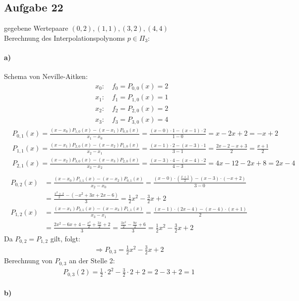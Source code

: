 \subsection*{Aufgabe 22}
gegebene Wertepaare $(0,2), (1,1), (3,2), (4,4)$\\
Berechnung des Interpolationspolynoms $p\in \Pi_3$:

\paragraph*{a)}
Schema von Neville-Aitken:\\
\begin{align*}
&x_0: \quad f_0=P_{0,0}(x)=2\\
&x_1: \quad f_1=P_{1,0}(x)=1\\
&x_2: \quad f_2=P_{2,0}(x)=2\\
&x_3: \quad f_3=P_{3,0}(x)=4
\end{align*}
\begin{align*}
&P_{0,1}(x)=\frac{(x-x_0)P_{1,0}(x)-(x-x_1)P_{0,0}(x)}{x_1-x_0}=\frac{(x-0)\cdot 1 -(x-1)\cdot2}{1-0}= x-2x+2=-x+2\\
&P_{1,1}(x)=\frac{(x-x_1)P_{2,0}(x)-(x-x_2)P_{1,0}(x)}{x_2-x_1}=\frac{(x-1)\cdot 2 -(x-3)\cdot 1}{3-1}= \frac{2x-2-x+3}{2}=\frac{x+1}{2}\\
&P_{2,1}(x)=\frac{(x-x_2)P_{3,0}(x)-(x-x_3)P_{2,0}(x)}{x_3-x_2}=\frac{(x-3)\cdot 4 -(x-4)\cdot 2}{4-3}= 4x-12-2x+8=2x-4\\
\end{align*}
\begin{align*}
P_{0,2}(x)&=\frac{(x-x_0)P_{1,1}(x)-(x-x_2)P_{0,1}(x)}{x_2-x_0}=\frac{(x-0)\cdot (\frac{x+1}{2}) -(x-3) \cdot(-x+2)}{3-0}\\ &=\frac{\frac{x^2+x}{2}-(-x^2+3x+2x-6)}{3}=\frac{1}{2}x^2-\frac{3}{2}x+2\\
P_{1,2}(x)&=\frac{(x-x_1)P_{2,1}(x)-(x-x_3)P_{1,1}(x)}{x_3-x_1}=\frac{(x-1)\cdot (2x-4) -(x-4) \cdot(x+1)}{2}\\ &=\frac{2x^2-6x+4-\frac{x^2}{2}+\frac{3x}{2}+2}{3}=\frac{\frac{3x^2}{2}-\frac{9x}{2}+6}{3}=\frac{1}{2}x^2-\frac{3}{2}x+2
\end{align*}
Da $P_{0,2}=P_{1,2}$ gilt, folgt:
\begin{align*}
\Rightarrow P_{0,3}=\frac{1}{2}x^2-\frac{3}{2}x+2
\end{align*}
Berechnung von $P_{0,3}$ an der Stelle 2:
\begin{align*}
P_{0,3}(2)=\frac{1}{2}\cdot 2^2-\frac{3}{2}\cdot 2+2=2-3+2=1
\end{align*}
\paragraph*{b)}


